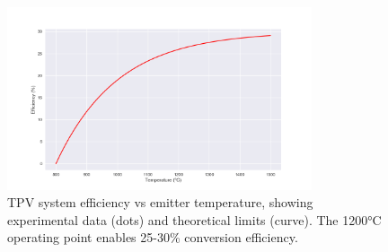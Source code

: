\documentclass{article}
\begin{document}
\begin{figure}[ht]
  \centering
  \includegraphics[width=0.8\textwidth]{efficiency.png}
  \caption{TPV system efficiency vs emitter temperature, showing experimental data (dots) and theoretical limits (curve). The 1200°C operating point enables 25-30\% conversion efficiency.}
  \label{fig:efficiency}
\end{figure}



\end{document}
